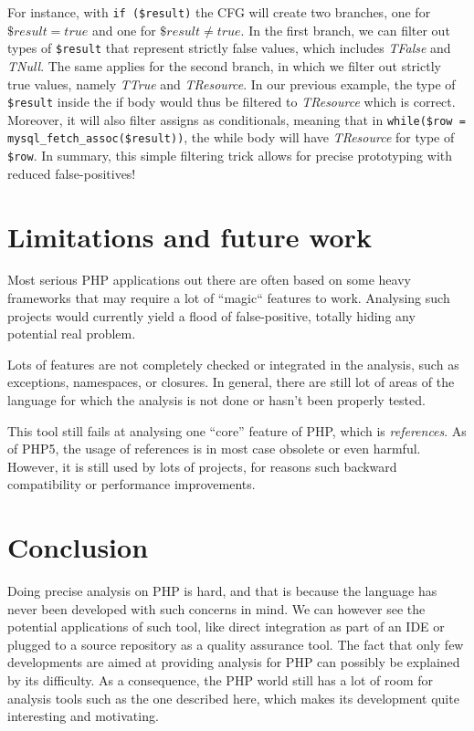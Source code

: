 \documentclass[a4paper]{article}
\begin{document}
For instance, with \verb/if ($result)/ the CFG will create two branches, one
for $\$result = true$ and one for $\$result \neq true$. In the first branch, we
can filter out types of \verb/$result/ that represent strictly false values,
which includes \emph{TFalse} and \emph{TNull}. The same applies for the second
branch, in which we filter out strictly true values, namely \emph{TTrue} and
\emph{TResource}. In our previous example, the type of \verb/$result/ inside
the if body would thus be filtered to \emph{TResource} which is correct.
Moreover, it will also filter assigns as conditionals, meaning that in 
\verb/while($row = mysql_fetch_assoc($result))/, the while body will have
\emph{TResource} for type of \verb/$row/. In summary, this simple filtering
trick allows for precise prototyping with reduced false-positives!

\section{Limitations and future work}
Most serious PHP applications out there are often based on some heavy frameworks
that may require a lot of ``magic`` features to work. Analysing such projects
would currently yield a flood of false-positive, totally hiding any potential
real problem.

Lots of features are not completely checked or integrated in the analysis,
such as exceptions, namespaces, or closures. In general, there are still
lot of areas of the language for which the analysis is not done or hasn't
been properly tested.

This tool still fails at analysing one ``core'' feature of PHP, which is
\emph{references}. As of PHP5, the usage of references is in most case obsolete
or even harmful. However, it is still used by lots of projects, for reasons
such backward compatibility or performance improvements.

\section{Conclusion}
Doing precise analysis on PHP is hard, and that is because the language has never
been developed with such concerns in mind. We can however see the potential
applications of such tool, like direct integration as part of an IDE or
plugged to a source repository as a quality assurance tool. The fact that only
few developments are aimed at providing analysis for PHP can possibly be
explained by its difficulty. As a consequence, the PHP world still has a lot
of room for analysis tools such as the one described here, which  makes its
development quite interesting and motivating.
\end{document}
